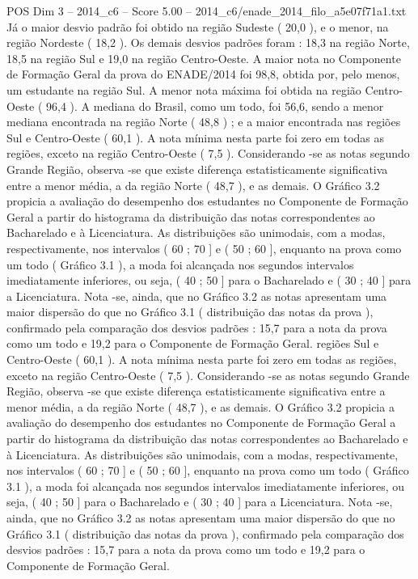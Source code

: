 \begin{textsample}{POS Dim 3 – 2014\_c6 – Score 5.00 – 2014\_c6/enade\_2014\_filo\_a5e07f71a1.txt}
Já o maior desvio padrão foi obtido na região Sudeste ( 20,0 ), e o menor, na região Nordeste ( 18,2 ).
Os demais desvios padrões foram : 18,3 na região Norte, 18,5 na região Sul e 19,0 na região Centro-Oeste.
A maior nota no Componente de Formação Geral da prova do ENADE/2014 foi 98,8, obtida por, pelo menos, um estudante na região Sul.
A menor nota máxima foi obtida na região Centro-Oeste ( 96,4 ).
A mediana do Brasil, como um todo, foi 56,6, sendo a menor mediana encontrada na região Norte ( 48,8 ) ; e a maior encontrada nas regiões Sul e Centro-Oeste ( 60,1 ).
A nota mínima nesta parte foi zero em todas as regiões, exceto na região Centro-Oeste ( 7,5 ).
Considerando -se as notas segundo Grande Região, observa -se que existe diferença estatisticamente significativa entre a menor média, a da região Norte ( 48,7 ), e as demais.
O Gráfico 3.2 propicia a avaliação do desempenho dos estudantes no Componente de Formação Geral a partir do histograma da distribuição das notas correspondentes ao Bacharelado e à Licenciatura.
As distribuições são unimodais, com a modas, respectivamente, nos intervalos ( 60 ; 70 ] e ( 50 ; 60 ], enquanto na prova como um todo ( Gráfico 3.1 ), a moda foi alcançada nos segundos intervalos imediatamente inferiores, ou seja, ( 40 ; 50 ] para o Bacharelado e ( 30 ; 40 ] para a Licenciatura.
Nota -se, ainda, que no Gráfico 3.2 as notas apresentam uma maior dispersão do que no Gráfico 3.1 ( distribuição das notas da prova ), confirmado pela comparação dos desvios padrões : 15,7 para a nota da prova como um todo e 19,2 para o Componente de Formação Geral. regiões Sul e Centro-Oeste ( 60,1 ).
A nota mínima nesta parte foi zero em todas as regiões, exceto na região Centro-Oeste ( 7,5 ).
Considerando -se as notas segundo Grande Região, observa -se que existe diferença estatisticamente significativa entre a menor média, a da região Norte ( 48,7 ), e as demais.
O Gráfico 3.2 propicia a avaliação do desempenho dos estudantes no Componente de Formação Geral a partir do histograma da distribuição das notas correspondentes ao Bacharelado e à Licenciatura.
As distribuições são unimodais, com a modas, respectivamente, nos intervalos ( 60 ; 70 ] e ( 50 ; 60 ], enquanto na prova como um todo ( Gráfico 3.1 ), a moda foi alcançada nos segundos intervalos imediatamente inferiores, ou seja, ( 40 ; 50 ] para o Bacharelado e ( 30 ; 40 ] para a Licenciatura.
Nota -se, ainda, que no Gráfico 3.2 as notas apresentam uma maior dispersão do que no Gráfico 3.1 ( distribuição das notas da prova ), confirmado pela comparação dos desvios padrões : 15,7 para a nota da prova como um todo e 19,2 para o Componente de Formação Geral.

\end{textsample}
